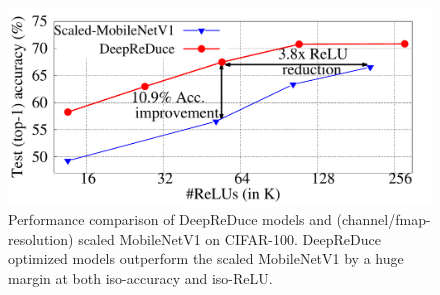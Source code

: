 \begin{figure}[t] \centering
\includegraphics[scale=0.45]{Figures/ParetoFrontier_MV1}
\caption{
Performance comparison of DeepReDuce models and (channel/fmap-resolution) scaled MobileNetV1 on CIFAR-100. DeepReDuce optimized models outperform the scaled MobileNetV1 by a huge margin at both iso-accuracy and iso-ReLU.}
\label{fig:ParetoFrontierMV1}
\end{figure}
